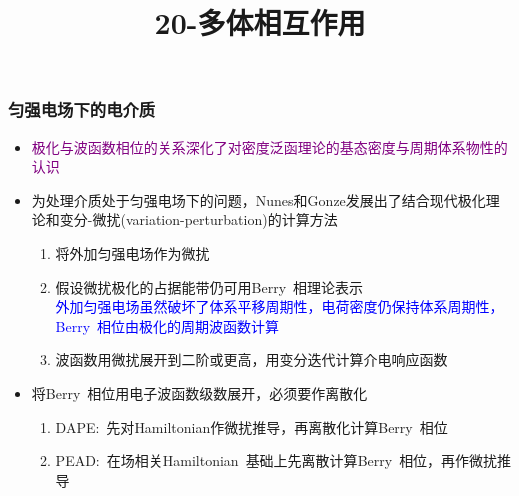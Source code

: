 \frame
{
	\frametitle{匀强电场下的电介质}
	\begin{itemize}
		\item \textcolor{purple}{极化与波函数相位的关系深化了对密度泛函理论的基态密度与周期体系物性的认识}
		\item 为处理介质处于匀强电场下的问题，\textrm{Nunes}和\textrm{Gonze}发展出了结合现代极化理论和变分-微扰(\textrm{variation-perturbation})的计算方法%
			\begin{enumerate}
				\item 将外加匀强电场作为微扰
				\item 假设微扰极化的占据能带仍可用\textrm{Berry~}相理论表示\\
					\textcolor{blue}{外加匀强电场虽然破坏了体系平移周期性，电荷密度仍保持体系周期性，\textrm{Berry~}相位由极化的周期波函数计算}
				\item 波函数用微扰展开到二阶或更高，用变分迭代计算介电响应函数
			\end{enumerate}
		\item 将\textrm{Berry~}相位用电子波函数级数展开，必须要作离散化\\
			\begin{enumerate}
				\item \textrm{DAPE}:~先对\textrm{Hamiltonian}作微扰推导，再离散化计算\textrm{Berry~}相位
				\item \textrm{PEAD}:~在场相关\textrm{Hamiltonian~}基础上先离散计算\textrm{Berry~}相位，再作微扰推导
			\end{enumerate}
	\end{itemize}
}

\title{20-多体相互作用}
